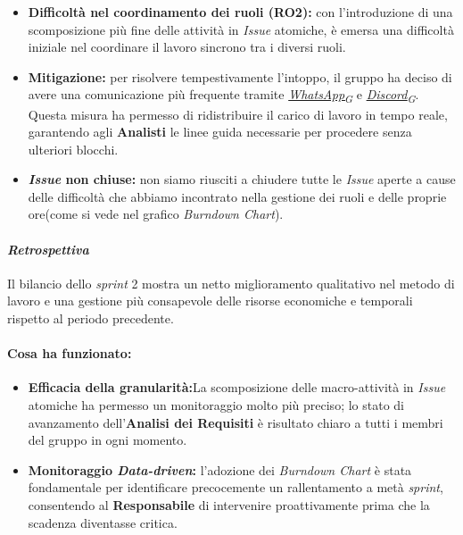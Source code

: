 \documentclass[12pt, a4paper]{article}
\newcommand{\urlglossario}{https://skynetunigroup.github.io/Code_Guardian/Documentazione/RTB/glossario_v1.0.0.pdf} %
\newcommand{\glo}[2]{\href{\urlglossario\#nameddest=#2}{#1\textsubscript{G}}}
\begin{document}
{\begin{itemize}
    \item \textbf{Difficoltà nel coordinamento dei ruoli (RO2):} con l'introduzione di una scomposizione più fine delle attività in \textit{Issue} atomiche, è emersa una difficoltà iniziale nel coordinare il lavoro sincrono tra i diversi ruoli.
    \item \textbf{Mitigazione:} per risolvere tempestivamente l'intoppo, il gruppo ha deciso di avere una comunicazione più frequente tramite \textit{\glo{WhatsApp}{whatsapp}} e \textit{\glo{Discord}{discord}}. Questa misura ha permesso di ridistribuire il carico di lavoro in tempo reale, garantendo agli \textbf{Analisti} le linee guida necessarie per procedere senza ulteriori blocchi.
    \item \textbf{\textit{Issue} non chiuse:} non siamo riusciti a chiudere tutte le \textit{Issue} aperte a cause delle difficoltà che abbiamo incontrato nella gestione dei ruoli e delle proprie ore(come si vede nel grafico \textit{Burndown Chart}).
\end{itemize}

\paragraph{\textit{Retrospettiva}}
Il bilancio dello \textit{sprint} 2 mostra un netto miglioramento qualitativo nel metodo di lavoro e una gestione più consapevole delle risorse economiche e temporali rispetto al periodo precedente.

\paragraph{Cosa ha funzionato:}
\begin{itemize}
    \item \textbf{Efficacia della granularità:}La scomposizione delle macro-attività in \textit{Issue} atomiche ha permesso un monitoraggio molto più preciso;
    lo stato di avanzamento dell'\textbf{Analisi dei Requisiti} è risultato chiaro a tutti i membri del gruppo in ogni momento.
    \item \textbf{Monitoraggio \textit{Data-driven}:} l'adozione dei \textit{Burndown Chart} è stata fondamentale per identificare precocemente un rallentamento a metà \textit{sprint}, consentendo al \textbf{Responsabile} di intervenire proattivamente prima che la scadenza diventasse critica.
\end{itemize}

}
\end{document}
